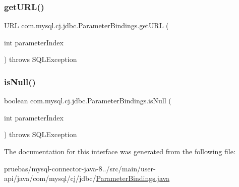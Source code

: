 \mbox{\label{interfacecom_1_1mysql_1_1cj_1_1jdbc_1_1_parameter_bindings_af28f57a78ba506316209ee5a758b2bfe}} 
\subsubsection{\texorpdfstring{get\+U\+R\+L()}{getURL()}}
{\footnotesize\ttfamily U\+RL com.\+mysql.\+cj.\+jdbc.\+Parameter\+Bindings.\+get\+U\+RL (\begin{DoxyParamCaption}\item[{int}]{parameter\+Index }\end{DoxyParamCaption}) throws S\+Q\+L\+Exception}

\mbox{\label{interfacecom_1_1mysql_1_1cj_1_1jdbc_1_1_parameter_bindings_a0b42ffb9b34b6391e72fb8a67630f7f1}} 
\subsubsection{\texorpdfstring{is\+Null()}{isNull()}}
{\footnotesize\ttfamily boolean com.\+mysql.\+cj.\+jdbc.\+Parameter\+Bindings.\+is\+Null (\begin{DoxyParamCaption}\item[{int}]{parameter\+Index }\end{DoxyParamCaption}) throws S\+Q\+L\+Exception}



The documentation for this interface was generated from the following file\+:\begin{DoxyCompactItemize}
\item 
pruebas/mysql-\/connector-\/java-\/8../src/main/user-\/api/java/com/mysql/cj/jdbc/\mbox{\hyperlink{_parameter_bindings_8java}{Parameter\+Bindings.\+java}}\end{DoxyCompactItemize}
